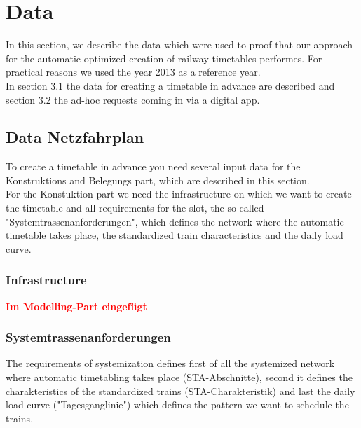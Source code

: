 \section{Data}
\label{chap:data}
In this section, we describe the data which were used to proof that our approach for the automatic optimized creation of railway timetables performes. For practical reasons we used the year 2013 as a reference year.\\
In section 3.1 the data for creating a timetable in advance are described and section 3.2 the ad-hoc requests coming in via a digital app.

\subsection{Data Netzfahrplan}
\label{chap:dataFinVe}
To create a timetable in advance you need several input data for the Konstruktions and Belegungs part, which are described in this section. \\
For the Konstuktion part we need the infrastructure on which we want to create the timetable and all requirements for the slot, the so called "Systemtrassenanforderungen", which defines the network where the automatic timetable takes place, the standardized train characteristics and the daily load curve. 

\subsubsection{Infrastructure}
\textbf{\textcolor{red}{Im Modelling-Part eingefügt}}

\subsubsection{Systemtrassenanforderungen}
The requirements of systemization defines first of all the systemized network where automatic timetabling takes place (STA-Abschnitte), second it defines the charakteristics of the standardized trains (STA-Charakteristik) and last the daily load curve ("Tagesganglinie") which defines the pattern we want to schedule the trains.

